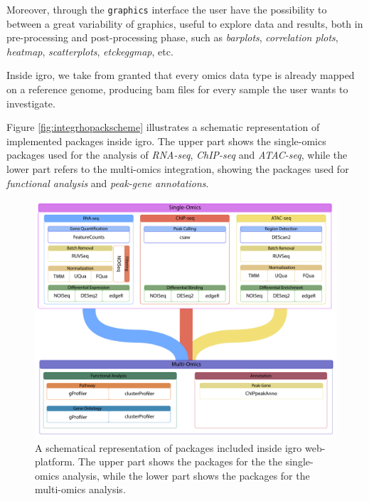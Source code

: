 Moreover, through the \lstinline!graphics! interface the user have the possibility to between a great variability of graphics, useful to explore data and results, both in pre-processing and post-processing phase, such as \textit{barplots}, \textit{correlation plots}, \textit{heatmap}, \textit{scatterplots}, \textit{etckeggmap}, etc.

Inside \gls{igro}, we take from granted that every omics data type is already mapped on a reference genome, producing \gls{bam} files for every sample the user wants to investigate.

Figure \ref{fig:integrhopackscheme} illustrates a schematic representation of implemented packages inside \gls{igro}.
The upper part shows the single-omics packages used for the analysis of \textit{RNA-seq}, \textit{ChIP-seq} and \textit{ATAC-seq}, while the lower part refers to the multi-omics integration, showing the packages used for \textit{functional analysis} and \textit{peak-gene annotations}.

\begin{figure}[h]
\centering
\includegraphics[width=\textwidth, keepaspectratio]{img/integrho/integrho_pack_scheme.pdf}
\caption[\gls{igro} packages scheme]{A schematical representation of packages included inside \gls{igro} web-platform.
The upper part shows the packages for the the single-omics analysis, while the lower part shows the packages for the multi-omics analysis.}
\label{fig:integrhopackascheme}
\end{figure}


